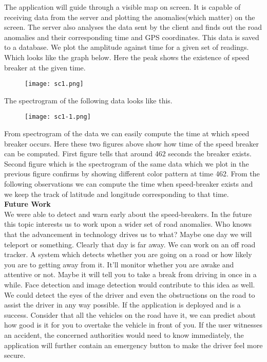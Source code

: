 \documentclass[12pt]{report}
\begin{document}
The application will guide through a visible map on screen. It is capable of receiving data from the server and plotting the anomalies(which matter) on the screen.
The server also analyses the data sent by the client and finds out the road anomalies and their corresponding time and GPS coordinates. This data is saved to a database.
We plot the amplitude against time for a given set of readings. Which looks like the graph below. Here the peak shows the existence of speed breaker at the given time.
\begin{figure}[ht!]
\centering
\texttt{[image: sc1.png]}
\end{figure} 
\newpage
The spectrogram of the following data looks like this.
\begin{figure}[ht!]
\centering
\texttt{[image: sc1-1.png]}
\end{figure} 
\newpage
From spectrogram of the data we can easily compute the time at which speed breaker occurs. Here these two figures above show how time of the speed breaker can be computed. First figure tells that around 462 seconds the breaker exists. Second figure which is the spectrogram of the same data which we plot in the previous figure confirms by showing different color pattern at time 462.
From the following observations we can compute the time when speed-breaker exists and we keep the track of latitude and longitude corresponding to that time.\\
\textbf{Future Work}\\
We were able to detect and warn early about the speed-breakers. In the future this topic interests us to work upon a wider set of road anomalies. Who knows that the advancement in technology drives us to what? Maybe one day we will teleport or something. Clearly that day is far away.
We can work on an off road tracker. A system which detects whether you are going on a road or how likely you are to getting away from it. It'll monitor whether you are awake and attentive or not. Maybe it will tell you to take a break from driving in once in a while.
Face detection and image detection would contribute to this idea as well. We could detect the eyes of the driver and even the obstructions on the road to assist the driver in any way possible.
If the application is deployed and is a success. Consider that all the vehicles on the road have it, we can predict about how good is it for you to overtake the vehicle in front of you.
If the user witnesses an accident, the concerned authorities would need to know immediately, the application will further contain an emergency button to make the driver feel more secure.
\end{document}
